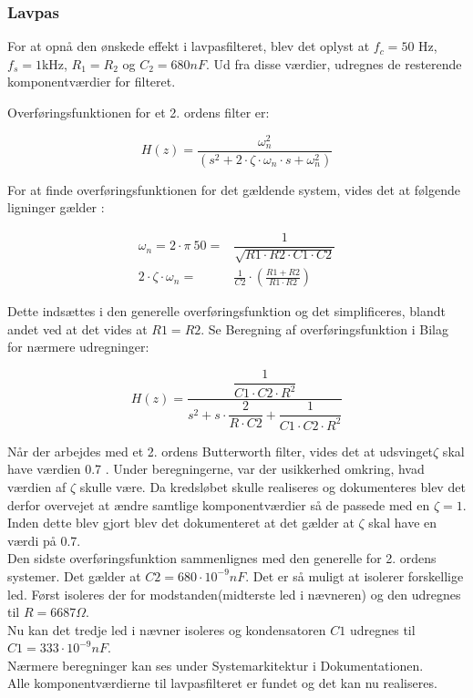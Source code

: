 \subsubsection{Lavpas}
For at opnå den ønskede effekt i lavpasfilteret, blev det oplyst at $ f_c=50$ Hz, $ f_s = 1$kHz, $ R_1 = R_2 $ og $ C_2=680 nF$. Ud fra disse værdier, udregnes de resterende komponentværdier for filteret.

Overføringsfunktionen for et 2. ordens filter er:
\begin{ceqn} 
\begin{equation}
H(z)=\frac{\omega_n^2}{(s^2 + 2\cdot\zeta \cdot \omega_n \cdot s+\omega_n^2)}
\end{equation}
\end{ceqn}

For at finde overføringsfunktionen for det gældende system, vides det at følgende ligninger gælder \cite{Wikilavpas}:
\begin{ceqn}
\begin{equation}
\begin{split}
\omega_n = 2\cdot \pi\ 50 =& \dfrac{1}{\sqrt{R1\cdot R2\cdot C1\cdot C2}}\\
2\cdot \zeta\cdot\omega_n =&\frac{1}{C2}\cdot \left( \frac{R1+R2}{R1\cdot R2}\right)
\end{split}
\end{equation}
\end{ceqn}
Dette indsættes i den generelle overføringsfunktion og det simplificeres, blandt andet ved at det vides at $ R1=R2 $. 
Se Beregning af overføringsfunktion i Bilag for nærmere udregninger:
\begin{ceqn} 
\begin{equation}
H(z)=\dfrac{\dfrac{1}{C1 \cdot C2\cdot R^2}}{s^2+s\cdot \dfrac{2}{R\cdot C2}+ \dfrac{1}{C1\cdot C2\cdot R^2}}
\end{equation}
\end{ceqn}
Når der arbejdes med et 2. ordens Butterworth filter, vides det at udsvinget$ \zeta $ skal have værdien 0.7 \cite{ASB}.
Under beregningerne, var der usikkerhed omkring, hvad værdien af $ \zeta $ skulle være. Da kredsløbet skulle realiseres og dokumenteres blev det derfor overvejet at ændre samtlige komponentværdier så de passede med en $ \zeta = 1 $. Inden dette blev gjort blev det dokumenteret at det gælder at $ \zeta $ skal have en værdi på 0.7. \\
  
Den sidste overføringsfunktion sammenlignes med den generelle for 2. ordens systemer. Det gælder at $ C2 = 680\cdot 10^{-9} nF $. Det er så muligt at isolerer forskellige led. Først isoleres der for modstanden(midterste led i nævneren) og den udregnes til $ R = 6687\Omega $. \\
Nu kan det tredje led i nævner isoleres og kondensatoren $ C1 $ udregnes til $ C1 = 333 \cdot 10^{-9} nF $. \\
Nærmere beregninger kan ses under Systemarkitektur i Dokumentationen. \\
Alle komponentværdierne til lavpasfilteret er fundet og det kan nu realiseres. \\ 

